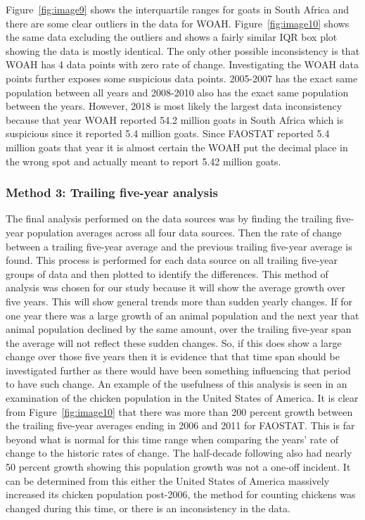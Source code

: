 \documentclass{article}
\begin{document}
Figure~\ref{fig:image9} shows the interquartile ranges for goats in South Africa and there are some clear outliers in the data for WOAH. Figure~\ref{fig:image10} shows the same data excluding the outliers and shows a fairly similar IQR box plot showing the data is mostly identical. The only other possible inconsistency is that WOAH has 4 data points with zero rate of change. Investigating the WOAH data points further exposes some suspicious data points. 2005-2007 has the exact same population between all years and 2008-2010 also has the exact same population between the years. However, 2018 is most likely the largest data inconsistency because that year WOAH reported 54.2 million goats in South Africa which is suspicious since it reported 5.4 million goats. Since FAOSTAT reported 5.4 million goats that year it is almost certain the WOAH put the decimal place in the wrong spot and actually meant to report 5.42 million goats. 

\subsubsection{Method 3: Trailing five-year analysis}

The final analysis performed on the data sources was by finding the trailing five-year population averages across all four data sources. Then the rate of change between a trailing five-year average and the previous trailing five-year average is found. This process is performed for each data source on all trailing five-year groups of data and then plotted to identify the differences. This method of analysis was chosen for our study because it will show the average growth over five years. This will show general trends more than sudden yearly changes. If for one year there was a large growth of an animal population and the next year that animal population declined by the same amount, over the trailing five-year span the average will not reflect these sudden changes. So, if this does show a large change over those five years then it is evidence that that time span should be investigated further as there would have been something influencing that period to have such change.
An example of the usefulness of this analysis is seen in an examination of the chicken population in the United States of America.
It is clear from Figure~\ref{fig:image10} that there was more than 200 percent growth between the trailing five-year averages ending in 2006 and 2011 for FAOSTAT. This is far beyond what is normal for this time range when comparing the years' rate of change to the historic rates of change. The half-decade following also had nearly 50 percent growth showing this population growth was not a one-off incident. It can be determined from this either the United States of America massively increased its chicken population post-2006, the method for counting chickens was changed during this time, or there is an inconsistency in the data.
\end{document}

